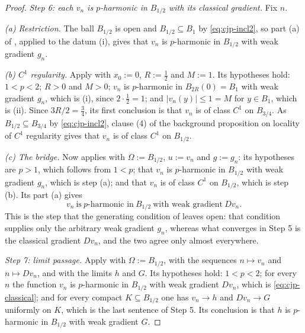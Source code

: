 \begin{proof}
\medskip\noindent\emph{Step 6: each $v_n$ is $p$-harmonic in $B_{1/2}$ with its classical
gradient.}
Fix $n$.

\emph{(a) Restriction.}  The ball $B_{1/2}$ is open and $B_{1/2}\subseteq B_1$ by
\eqref{eq:cjp-incl2}, so part (a) of , applied to the datum (i), gives
that $v_n$ is $p$-harmonic in $B_{1/2}$ with weak gradient $g_n$.

\emph{(b) $C^1$ regularity.}  Apply  with $x_0:=0$,
$R:=\tfrac12$ and $M:=1$.  Its hypotheses hold: $1<p<2$; $R>0$ and $M>0$; $v_n$ is $p$-harmonic
in $B_{2R}(0)=B_1$ with weak gradient $g_n$, which is (i), since $2\cdot\tfrac12=1$; and
$\lvert v_n(y)\rvert\le1=M$ for $y\in B_1$, which is (ii).  Since $3R/2=\tfrac34$, its first
conclusion is that $v_n$ is of class $C^1$ on $B_{3/4}$.  As $B_{1/2}\subseteq B_{3/4}$ by
\eqref{eq:cjp-incl2}, clause (4) of the background proposition on locality of $C^1$ regularity
gives that $v_n$ is of class $C^1$ on $B_{1/2}$.

\emph{(c) The bridge.}  Now  applies with $\Omega:=B_{1/2}$,
$u:=v_n$ and $g:=g_n$: its hypotheses are $p>1$, which follows from $1<p$; that $v_n$ is
$p$-harmonic in $B_{1/2}$ with weak gradient $g_n$, which is step (a); and that $v_n$ is of
class $C^1$ on $B_{1/2}$, which is step (b).  Its part (a) gives
\begin{equation}\label{eq:cjp-classical}
  v_n\ \text{is}\ p\text{-harmonic in}\ B_{1/2}\ \text{with weak gradient}\ Dv_n .
\end{equation}
This is the step that the generating condition of  leaves open: that
condition supplies only the arbitrary weak gradient $g_n$, whereas what converges in Step 5 is
the classical gradient $Dv_n$, and the two agree only almost everywhere.

\medskip\noindent\emph{Step 7: limit passage.}
Apply  with $\Omega:=B_{1/2}$, with the sequences $n\mapsto v_n$ and
$n\mapsto Dv_n$, and with the limits $h$ and $G$.  Its hypotheses hold: $1<p<2$; for every $n$
the function $v_n$ is $p$-harmonic in $B_{1/2}$ with weak gradient $Dv_n$, which is
\eqref{eq:cjp-classical}; and for every compact $K\subseteq B_{1/2}$ one has $v_n\to h$ and
$Dv_n\to G$ uniformly on $K$, which is the last sentence of Step 5.  Its conclusion is that $h$
is $p$-harmonic in $B_{1/2}$ with weak gradient $G$.


\end{proof}
